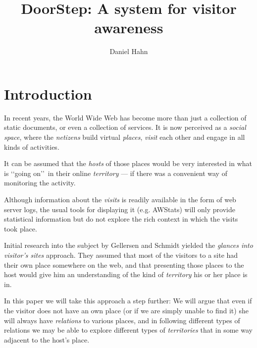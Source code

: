 \documentclass[a4paper]{danarticle}
\theoremstyle{remark}
\begin{document}
  \author{Daniel Hahn}
  \title{DoorStep: A system for visitor awareness}
  \maketitle
  
  \section{Introduction}
    In recent years, the World Wide Web has become more than just a collection
    of static documents, or even a collection of services. It is now perceived
    as a \textit{social space}, where the \textit{netizens} build virtual
    \textit{places}, \textit{visit} each other and engage in all kinds of
    activities.
    
    It can be assumed that the \textit{hosts} of those places would be
    very interested in what is \lq\lq going on\rq\rq\ in their online
    \textit{territory} --- if
    there was a convenient way of monitoring the activity. 
    
    Although
    information about the \textit{visits} is readily available in the
    form of web server logs, the usual tools for displaying it (e.g. 
    AWStats\cite{awstats}) will only
    provide statistical information but do not explore the rich context in which
    the visits took place. 
    
    Initial research into the subject by Gellersen and Schmidt\cite{webaware}
    yielded the
    \textit{glances into visitor's sites} approach. They assumed that most of
    the visitors to a site had their own place somewhere on the web, and that
    presenting those places to the host would give him an understanding of the
    kind of \textit{territory} his or her place is in.
    
    In this paper we will take this approach a step further: We will argue that
    even if the visitor does not have an own place (or if we are
    simply unable to find it) she will always have \textit{relations} to various
    places, and in following different types of relations we may be able to
    explore different types of \textit{territories} that in some way adjacent to
    the host's place.
    
\end{document}
